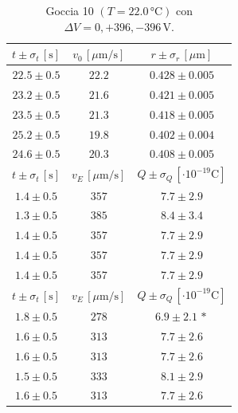 \documentclass[]{article}
\begin{document}
    \begin{table}[H]
        \centering
        \begin{tabular}{||c|c|c||}
            \hline
            $t \pm \sigma_t \, \left[\text{s}\right]$ & $v_0 \, \left[\mu\text{m/s}\right]$ & $r \pm \sigma_r \, \left[\mu\text{m}\right]$ \\\hline
            \hline
            $22.5 \pm 0.5$ & $22.2$ & $0.428 \pm 0.005$ \\\hline
            $23.2 \pm 0.5$ & $21.6$ & $0.421 \pm 0.005$ \\\hline
            $23.5 \pm 0.5$ & $21.3$ & $0.418 \pm 0.005$ \\\hline
            $25.2 \pm 0.5$ & $19.8$ & $0.402 \pm 0.004$ \\\hline
            $24.6 \pm 0.5$ & $20.3$ & $0.408 \pm 0.005$ \\\hline
            \hline
            $t \pm \sigma_t \, \left[\text{s}\right]$ & $v_E \, \left[\mu\text{m/s}\right]$ & $Q \pm \sigma_Q \, \left[\cdot 10^{-19} \text{C}\right]$ \\\hline
            \hline
            $1.4 \pm 0.5$ & $357$ & $7.7 \pm 2.9$ \\\hline
            $1.3 \pm 0.5$ & $385$ & $8.4 \pm 3.4$ \\\hline
            $1.4 \pm 0.5$ & $357$ & $7.7 \pm 2.9$ \\\hline
            $1.4 \pm 0.5$ & $357$ & $7.7 \pm 2.9$ \\\hline
            $1.4 \pm 0.5$ & $357$ & $7.7 \pm 2.9$ \\\hline
            \hline
            $t \pm \sigma_t \, \left[\text{s}\right]$ & $v_E \, \left[\mu\text{m/s}\right]$ & $Q \pm \sigma_Q \, \left[\cdot 10^{-19} \text{C}\right]$ \\\hline
            \hline
            $1.8 \pm 0.5$ & $278$ & $6.9 \pm 2.1\,\ast$ \\\hline
            $1.6 \pm 0.5$ & $313$ & $7.7 \pm 2.6$ \\\hline
            $1.6 \pm 0.5$ & $313$ & $7.7 \pm 2.6$ \\\hline
            $1.5 \pm 0.5$ & $333$ & $8.1 \pm 2.9$ \\\hline
            $1.6 \pm 0.5$ & $313$ & $7.7 \pm 2.6$ \\\hline
        \end{tabular}
        \caption{Goccia 10 $\left(T = 22.0\, \text{°C}\right)$ con $\Delta V = 0,+396,-396 \,\text{V}$.}
        \label{goccia-10}
    \end{table}
\end{document}
